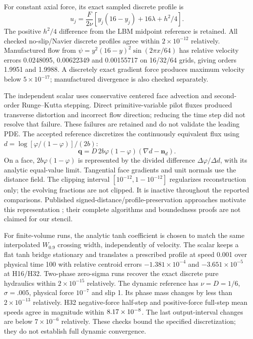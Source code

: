 For constant axial force, its exact sampled discrete profile is
\begin{equation}
 u_j=\frac{F}{2\nu}
 [y_j(16-y_j)+16\lambda+h^2/4].
\end{equation}
The positive $h^2/4$ difference from the LBM midpoint reference is retained.
All checked no-slip/Navier discrete profiles agree within $2\times10^{-12}$
relatively. Manufactured flow from
$\psi=y^2(16-y)^2\sin(2\pi x/64)$ has relative velocity errors
0.0248095, 0.00622349 and 0.00155717 on 16/32/64 grids, giving
orders 1.9951 and 1.9988. A discretely exact gradient force produces
maximum velocity below $5\times10^{-17}$; manufactured divergence is
also checked separately.

The independent scalar uses conservative centered face advection and
second-order Runge--Kutta stepping. Direct primitive-variable pilot
fluxes produced transverse distortion and incorrect flow direction;
reducing the time step did not resolve that failure. These failures
are retained and do not validate the leading PDE.
The accepted reference discretizes the continuously equivalent flux
using $d=\log[\varphi/(1-\varphi)]/(2b)$:
\begin{equation}
 \bm q=D\,2b\varphi(1-\varphi)(\nabla d-\bm n_d).
\end{equation}
On a face, $2b\varphi(1-\varphi)$ is represented by the divided
difference $\Delta\varphi/\Delta d$, with its analytic equal-value limit.
Tangential face gradients and unit normals use the distance field.
The clipping interval $[10^{-12},1-10^{-12}]$ regularizes reconstruction
only; the evolving fractions are not clipped. It is inactive throughout
the reported comparisons. Published signed-distance/profile-preservation
approaches motivate this representation \cite{hao2024}; their complete
algorithms and boundedness proofs are not claimed for our stencil.

For finite-volume runs, the analytic tanh coefficient is chosen to match
the same interpolated $W_{0.9}$ crossing width, independently of velocity.
The scalar keeps a flat tanh bridge stationary and translates a prescribed
profile at speed 0.001 over physical time 100 with relative centroid
errors $-1.381\times10^{-4}$ and $-3.651\times10^{-5}$ at H16/H32.
Two-phase zero-sigma runs recover the exact discrete pure hydraulics
within $2\times10^{-15}$ relatively. The dynamic reference has
$\nu=D=1/6$, $\sigma=.005$, physical force $10^{-7}$ and slip 1.
Its phase mass changes by less than $2\times10^{-13}$ relatively.
H32 negative-force half-step and positive-force full-step mean speeds
agree in magnitude within $8.17\times10^{-8}$. The last output-interval
changes are below $7\times10^{-6}$ relatively. These checks bound the
specified discretization; they do not establish full dynamic convergence.

